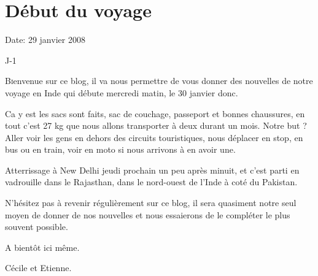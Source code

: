 \section{Début du voyage}

Date: 29 janvier 2008

\begin{multicols}{2}

J-1

\lettrine[findent=.3em]{B}ienvenue sur ce blog, il va nous permettre de vous donner des nouvelles de notre voyage en Inde qui débute mercredi matin, le 30 janvier donc.

Ca y est les sacs sont faits, sac de couchage, passeport et bonnes chaussures, en tout c'est 27 kg que nous allons transporter à deux durant un mois. Notre but ? Aller voir les gens en dehors des circuits touristiques, nous déplacer en stop, en bus ou en train, voir en moto si nous arrivons à en avoir une.

Atterrissage à New Delhi jeudi prochain un peu après minuit, et c'est parti en vadrouille dans le Rajasthan, dans le nord-ouest de l'Inde à coté du Pakistan.

N'hésitez pas à revenir régulièrement sur ce blog, il sera quasiment notre seul moyen de donner de nos nouvelles et nous essaierons de le compléter le plus souvent possible.

A bientôt ici même.

Cécile et Etienne.

\end{multicols}



